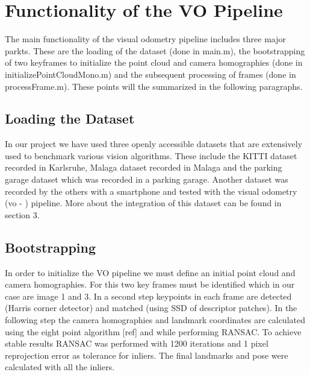 \chapter{Functionality of the VO Pipeline}
The main functionality of the visual odometry pipeline includes three major parkts. These are the loading of the dataset (done in main.m), the bootstrapping of two keyframes to initialize the point cloud and camera homographies (done in initializePointCloudMono.m) and the subsequent processing of frames (done in processFrame.m).
These points will the summarized in the following paragraphs.

\section{Loading the Dataset}
In our project we have used three openly accessible datasets that are extensively used to benchmark various vision algorithms. These include the KITTI dataset recorded in Karlsruhe, Malaga dataset recorded in Malaga and the parking garage dataset which was recorded in a parking garage. Another dataset was recorded by the others with a smartphone and tested with the visual odometry (vo - ) pipeline. More about the integration of this dataset can be found in section 3.

\section{Bootstrapping}
In order to initialize the VO pipeline we must define an initial point cloud and camera homographies. For this two key frames must be identified which in our case are image 1 and 3. In a second step keypoints in each frame are detected (Harris corner detector) and matched (using SSD of descriptor patches). In the following step the camera homographies and landmark coordinates are calculated using the eight point algorithm [ref] and while performing RANSAC. To achieve stable results RANSAC was performed with 1200 iterations and 1 pixel reprojection error as tolerance for inliers. The final landmarks and pose were calculated with all the inliers.      

